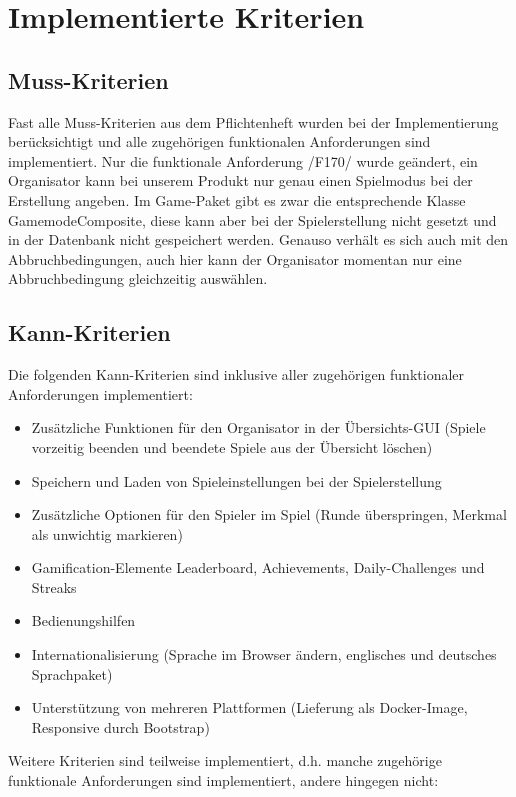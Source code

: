 \documentclass[a4paper]{scrreprt}
\begin{document}
\chapter{Implementierte Kriterien}

\section{Muss-Kriterien}
Fast alle Muss-Kriterien aus dem Pflichtenheft wurden bei der Implementierung berücksichtigt und alle zugehörigen funktionalen Anforderungen sind implementiert. Nur die funktionale Anforderung /F170/ wurde geändert, ein Organisator kann bei unserem Produkt nur genau einen Spielmodus bei der Erstellung angeben. Im Game-Paket gibt es zwar die entsprechende Klasse GamemodeComposite, diese kann aber bei der Spielerstellung nicht gesetzt und in der Datenbank nicht gespeichert werden. Genauso verhält es sich auch mit den Abbruchbedingungen, auch hier kann der Organisator momentan nur eine Abbruchbedingung gleichzeitig auswählen.


\section{Kann-Kriterien}
Die folgenden Kann-Kriterien sind inklusive aller zugehörigen funktionaler Anforderungen implementiert:

\begin{itemize}
\item Zusätzliche Funktionen für den Organisator in der Übersichts-GUI (Spiele vorzeitig beenden und beendete Spiele aus der Übersicht löschen)
\item Speichern und Laden von Spieleinstellungen bei der Spielerstellung
\item Zusätzliche Optionen für den Spieler im Spiel (Runde überspringen, Merkmal als unwichtig markieren)
\item Gamification-Elemente Leaderboard, Achievements, Daily-Challenges und Streaks
\item Bedienungshilfen
\item Internationalisierung (Sprache im Browser ändern, englisches und deutsches Sprachpaket)
\item Unterstützung von mehreren Plattformen (Lieferung als Docker-Image, Responsive durch Bootstrap)
\end{itemize}

\hspace{1cm}

Weitere Kriterien sind teilweise implementiert, d.h. manche zugehörige funktionale Anforderungen sind implementiert, andere hingegen nicht:
\end{document}
